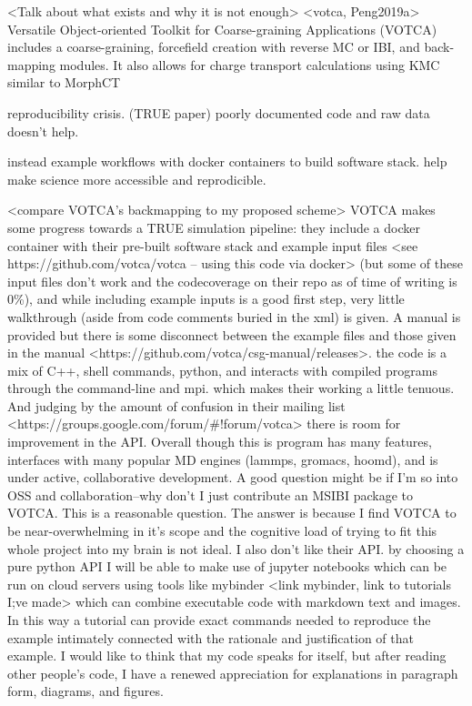 <Talk about what exists and why it is not enough>
<votca, Peng2019a> 
Versatile Object-oriented Toolkit for Coarse-graining Applications (VOTCA) \cite{Ruhle2011b}
includes a coarse-graining, forcefield creation with reverse MC or IBI, and back-mapping modules.
It also allows for charge transport calculations using KMC similar to MorphCT \cite{Lukyanov2010}

reproducibility crisis.\cite{Cummings2019} \cite{Thompson2020} (TRUE paper) poorly documented code and raw data doesn't help.

instead example workflows with docker containers to build software stack.
help make science more accessible and reprodicible.

<compare VOTCA's backmapping to my proposed scheme>
VOTCA makes some progress towards a TRUE simulation pipeline: they include a docker container with their pre-built software stack and example input files <see https://github.com/votca/votca -- using this code via docker> (but some of these input files don't work and the codecoverage on their repo as of time of writing is 0\%), and while including example inputs is a good first step, very little walkthrough (aside from code comments buried in the xml) is given.
A manual is provided but there is some disconnect between the example files and those given in the manual <https://github.com/votca/csg-manual/releases>.
the code is a mix of C++, shell commands, python, and interacts with compiled programs through the command-line and mpi.
which makes their working a little tenuous.
And judging by the amount of confusion in their mailing list <https://groups.google.com/forum/\#!forum/votca> there is room for improvement in the API.
Overall though this is program has many features, interfaces with many popular MD engines (lammps, gromacs, hoomd), and is under active, collaborative development.
A good question might be if I'm so into OSS and collaboration--why don't I just contribute an MSIBI package to VOTCA.
This is a reasonable question.
The answer is because I find VOTCA to be near-overwhelming in it's scope and the cognitive load of trying to fit this whole project into my brain is not ideal.
I also don't like their API.
by choosing a pure python API I will be able to make use of jupyter notebooks which can be run on cloud servers using tools like mybinder <link mybinder, link to tutorials I;ve made> which can combine executable code with markdown text and images.
In this way a tutorial can provide exact commands needed to reproduce the example intimately connected with the rationale and justification of that example.
I would like to think that my code speaks for itself, but after reading other people's code, I have a renewed appreciation for explanations in paragraph form, diagrams, and figures.

